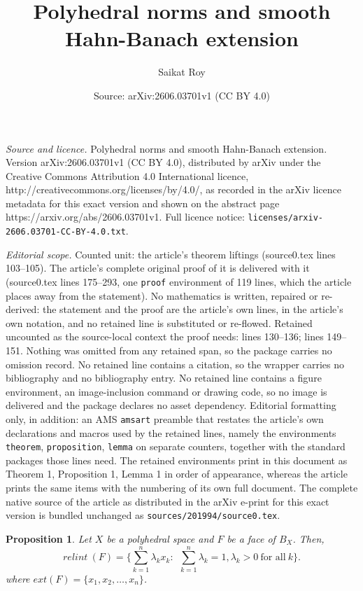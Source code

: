 \documentclass[10pt,a4paper]{amsart}
\title{Polyhedral norms and smooth Hahn-Banach extension}
\author{Saikat Roy}
\date{Source: arXiv:2606.03701v1 (CC BY 4.0)}
\newtheorem{proposition}{Proposition}
\begin{document}
\maketitle

\noindent\emph{Source and licence.} Polyhedral norms and smooth Hahn-Banach extension. Version arXiv:2606.03701v1 (CC BY 4.0), distributed by arXiv under the Creative Commons Attribution 4.0 International licence, http://creativecommons.org/licenses/by/4.0/, as recorded in the arXiv licence metadata for this exact version and shown on the abstract page https://arxiv.org/abs/2606.03701v1. Full licence notice: \texttt{licenses/arxiv-2606.03701-CC-BY-4.0.txt}.\par\smallskip

\noindent\textit{Editorial scope.} Counted unit: the article's theorem liftings (source0.tex lines 103--105). The article's complete original proof of it is delivered with it (source0.tex lines 175--293, one \texttt{proof} environment of 119 lines, which the article places away from the statement). No mathematics is written, repaired or re-derived: the statement and the proof are the article's own lines, in the article's own notation, and no retained line is substituted or re-flowed.  Retained uncounted as the source-local context the proof needs: lines 130--136; lines 149--151.  Nothing was omitted from any retained span, so the package carries no omission record.  No retained line contains a citation, so the wrapper carries no bibliography and no bibliography entry.  No retained line contains a figure environment, an image-inclusion command or drawing code, so no image is delivered and the package declares no asset dependency.  Editorial formatting only, in addition: an AMS \texttt{amsart} preamble that restates the article's own declarations and macros used by the retained lines, namely the environments \texttt{theorem}, \texttt{proposition}, \texttt{lemma} on separate counters, together with the standard packages those lines need.  The retained environments print in this document as Theorem 1, Proposition 1, Lemma 1 in order of appearance, whereas the article prints the same items with the numbering of its own full document.  The complete native source of the article as distributed in the arXiv e-print for this exact version is bundled unchanged as \texttt{sources/201994/source0.tex}.
\begin{proposition}\label{prop:smooth}
Let $X$ be a polyhedral space and $F$ be a face of $B_X$. Then,
\[
relint~(F)=\{\sum_{k=1}^n \lambda_k x_k:~~\sum_{k=1}^n \lambda_k=1, \lambda_k>0~\text{for all}~k\}.
\]
where $ext(F)=\{x_1,x_2,\dots,x_n\}$.
\end{proposition}
\end{document}
